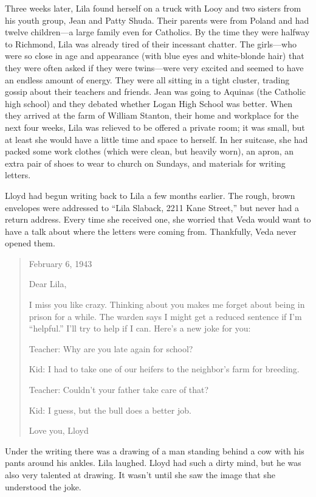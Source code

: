 \documentclass[
  american,
  letterpaper,
]{book}
\begin{document}
Three weeks later, Lila found herself on a truck with Looy and two
sisters from his youth group, Jean and Patty Shuda. Their parents were
from Poland and had twelve children---a large family even for Catholics.
By the time they were halfway to Richmond, Lila was already tired of
their incessant chatter. The girls---who were so close in age and
appearance (with blue eyes and white-blonde hair) that they were often
asked if they were twins---were very excited and seemed to have an
endless amount of energy. They were all sitting in a tight cluster,
trading gossip about their teachers and friends. Jean was going to
Aquinas (the Catholic high school) and they debated whether Logan High
School was better. When they arrived at the farm of William Stanton,
their home and workplace for the next four weeks, Lila was relieved to
be offered a private room; it was small, but at least she would have a
little time and space to herself. In her suitcase, she had packed some
work clothes (which were clean, but heavily worn), an apron, an extra
pair of shoes to wear to church on Sundays, and materials for writing
letters.

Lloyd had begun writing back to Lila a few months earlier. The rough,
brown envelopes were addressed to ``Lila Slaback, 2211 Kane Street,''
but never had a return address. Every time she received one, she worried
that Veda would want to have a talk about where the letters were coming
from. Thankfully, Veda never opened them.

\begin{quote}
February 6, 1943

Dear Lila,

I miss you like crazy. Thinking about you makes me forget about being in
prison for a while. The warden says I might get a reduced sentence if
I'm ``helpful.'' I'll try to help if I can. Here's a new joke for you:

Teacher: Why are you late again for school?

Kid: I had to take one of our heifers to the neighbor's farm for
breeding.

Teacher: Couldn't your father take care of that?

Kid: I guess, but the bull does a better job.

Love you, Lloyd
\end{quote}

Under the writing there was a drawing of a man standing behind a cow
with his pants around his ankles. Lila laughed. Lloyd had such a dirty
mind, but he was also very talented at drawing. It wasn't until she saw
the image that she understood the joke.
\end{document}
